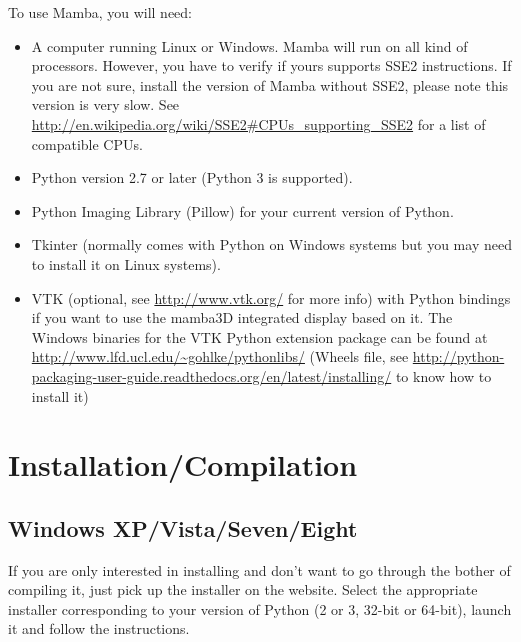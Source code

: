 \documentclass[a4paper,10pt,oneside]{article}
\begin{document}
To use Mamba, you will need:
\begin{itemize}
\item A computer running Linux or Windows. Mamba will run on all kind of 
processors. However, you have to verify if yours supports SSE2 instructions. If you
are not sure, install the version of Mamba without SSE2, please note this version
is very slow. See \url{http://en.wikipedia.org/wiki/SSE2#CPUs_supporting_SSE2}
for a list of compatible CPUs.
\item Python version 2.7 or later (Python 3 is supported).
\item Python Imaging Library (Pillow) for your current version of Python.
\item Tkinter (normally comes with Python on Windows systems but you may need to
install it on Linux systems).
\item VTK (optional, see \url{http://www.vtk.org/} for more info) with Python
bindings if you want to use the mamba3D integrated display based on it. The Windows
binaries for the VTK Python extension package can be found at
\url{http://www.lfd.ucl.edu/~gohlke/pythonlibs/} (Wheels file, see
\url{http://python-packaging-user-guide.readthedocs.org/en/latest/installing/} to
know how to install it)
\end{itemize}



\pagebreak

\section{Installation/Compilation}
\label{cha:inst_comp}

\subsection{Windows XP/Vista/Seven/Eight}

If you are only interested in installing and don't want to go through the bother
of compiling it, just pick up the installer on the website. Select the appropriate
installer corresponding to your version of Python (2 or 3, 32-bit or 64-bit), 
launch it and follow the instructions.
\end{document}
